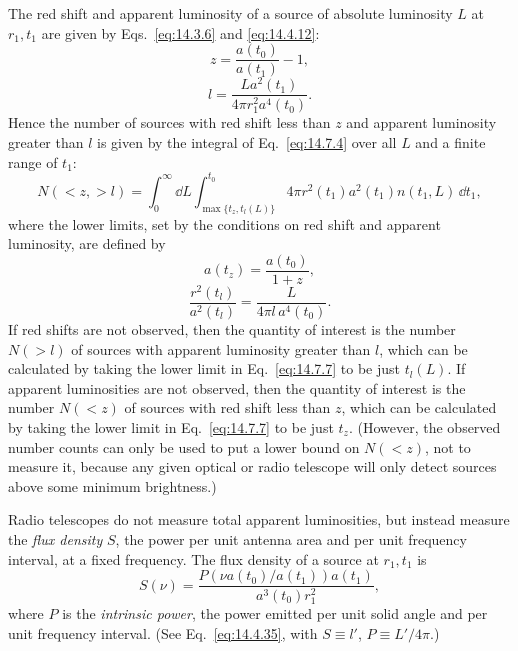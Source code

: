The red shift and apparent luminosity of a source of absolute luminosity
\(L\) at \(r_1,t_1\) are given by Eqs.~\eqref{eq:14.3.6} and
\eqref{eq:14.4.12}:
\begin{equation}
  z=\frac{a(t_0)}{a(t_1)}-1,
  \tag{14.7.5}\label{eq:14.7.5}
\end{equation}
\begin{equation}
  l
  =
  \frac{La^2(t_1)}{4\pi r_1^2a^4(t_0)}.
  \tag{14.7.6}\label{eq:14.7.6}
\end{equation}
Hence the number of sources with red shift less than \(z\) and apparent
luminosity greater than \(l\) is given by the integral of
Eq.~\eqref{eq:14.7.4} over all \(L\) and a finite range of \(t_1\):
\begin{equation}
  N(<z,>l)
  =
  \int_0^\infty\dd L
  \int_{\max\{t_z,t_l(L)\}}^{t_0}
  4\pi r^2(t_1)a^2(t_1)n(t_1,L)\,\dd t_1,
  \tag{14.7.7}\label{eq:14.7.7}
\end{equation}
where the lower limits, set by the conditions on red shift and apparent
luminosity, are defined by
\begin{equation}
  a(t_z)=\frac{a(t_0)}{1+z},
  \tag{14.7.8}\label{eq:14.7.8}
\end{equation}
\begin{equation}
  \frac{r^2(t_l)}{a^2(t_l)}
  =
  \frac{L}{4\pi l\,a^4(t_0)}.
  \tag{14.7.9}\label{eq:14.7.9}
\end{equation}
If red shifts are not observed, then the quantity of interest is the number
\(N(>l)\) of sources with apparent luminosity greater than \(l\), which can
be calculated by taking the lower limit in Eq.~\eqref{eq:14.7.7} to be just
\(t_l(L)\). If apparent luminosities are not observed, then the quantity of
interest is the number \(N(<z)\) of sources with red shift less than \(z\),
which can be calculated by taking the lower limit in
Eq.~\eqref{eq:14.7.7} to be just \(t_z\). (However, the observed number
counts can only be used to put a lower bound on \(N(<z)\), not to measure
it, because any given optical or radio telescope will only detect sources
above some minimum brightness.)

Radio telescopes do not measure total apparent luminosities, but instead
measure the \emph{flux density} \(S\), the power per unit antenna area and
per unit frequency interval, at a fixed frequency. The flux density of a
source at \(r_1,t_1\) is
\begin{equation}
  S(\nu)
  =
  \frac{
    P\!\left(\nu a(t_0)/a(t_1)\right)a(t_1)
  }{
    a^3(t_0)r_1^2
  },
  \tag{14.7.10}\label{eq:14.7.10}
\end{equation}
where \(P\) is the \emph{intrinsic power}, the power emitted per unit solid
angle and per unit frequency interval. (See Eq.~\eqref{eq:14.4.35}, with
\(S\equiv l'\), \(P\equiv L'/4\pi\).)

